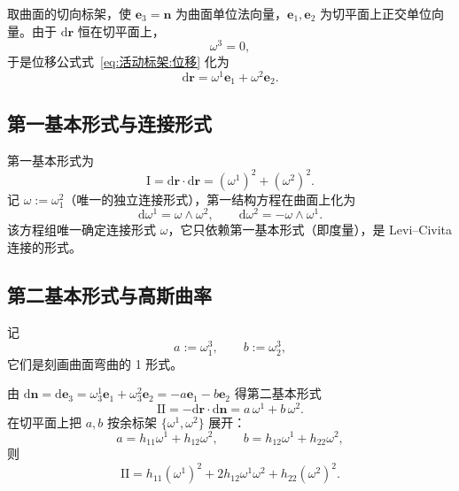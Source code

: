 取曲面的切向标架，使 $\mathbf{e}_3=\mathbf{n}$ 为曲面单位法向量，$\mathbf{e}_1,\mathbf{e}_2$ 为切平面上正交单位向量。由于 $\mathrm{d}\boldsymbol{r}$ 恒在切平面上，
\begin{equation}
	\omega^{3}=0,
	\label{eq:曲面:omega3为零}
\end{equation}
于是位移公式式~\eqref{eq:活动标架:位移} 化为
\begin{equation}
	\mathrm{d}\boldsymbol{r}=\omega^{1}\mathbf{e}_1+\omega^{2}\mathbf{e}_2.
	\label{eq:曲面:位移}
\end{equation}

\subsection{第一基本形式与连接形式}

\begin{proposition}[第一基本形式与结构方程]
	第一基本形式为
	\begin{equation}
		\mathrm{I}=\mathrm{d}\boldsymbol{r}\cdot\mathrm{d}\boldsymbol{r}
		=(\omega^{1})^{2}+(\omega^{2})^{2}.
		\label{eq:曲面:第一基本形式}
	\end{equation}
	记 $\omega:=\omega_{1}^{2}$（唯一的独立连接形式），第一结构方程在曲面上化为
	\begin{equation}
		\mathrm{d}\omega^{1}=\omega\wedge\omega^{2},
		\qquad
		\mathrm{d}\omega^{2}=-\omega\wedge\omega^{1}.
		\label{eq:曲面:第一结构方程}
	\end{equation}
	该方程组唯一确定连接形式 $\omega$，它只依赖第一基本形式（即度量），是 Levi--Civita 连接的形式。
\end{proposition}

\subsection{第二基本形式与高斯曲率}

记
\begin{equation}
	a:=\omega_{1}^{3},\qquad b:=\omega_{2}^{3},
	\label{eq:曲面:ab定义}
\end{equation}
它们是刻画曲面弯曲的 1 形式。

\begin{proposition}[第二基本形式]
	由 $\mathrm{d}\mathbf{n}=\mathrm{d}\mathbf{e}_3=\omega_{3}^{1}\mathbf{e}_1+\omega_{3}^{2}\mathbf{e}_2=-a\mathbf{e}_1-b\mathbf{e}_2$ 得第二基本形式
	\begin{equation}
		\mathrm{II}=-\mathrm{d}\boldsymbol{r}\cdot\mathrm{d}\mathbf{n}
		=a\,\omega^{1}+b\,\omega^{2}.
		\label{eq:曲面:第二基本形式}
	\end{equation}
	在切平面上把 $a,b$ 按余标架 $\{\omega^{1},\omega^{2}\}$ 展开：
	\begin{equation}
		a=h_{11}\omega^{1}+h_{12}\omega^{2},\qquad
		b=h_{12}\omega^{1}+h_{22}\omega^{2},
		\label{eq:曲面:ab展开}
	\end{equation}
	则
	\begin{equation}
		\mathrm{II}=h_{11}(\omega^{1})^{2}+2h_{12}\omega^{1}\omega^{2}+h_{22}(\omega^{2})^{2}.
		\label{eq:曲面:第二基本形式展开}
	\end{equation}
\end{proposition}


